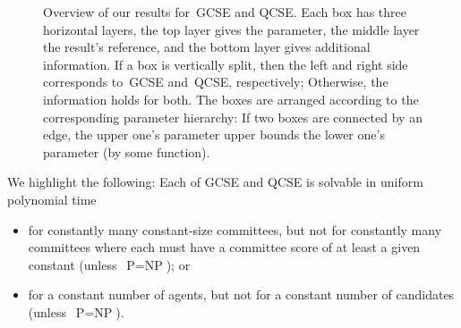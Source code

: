 \documentclass[10pt,a4paper,twocolumn]{article}
\theoremstyle{plain}
\theoremstyle{definition}
\theoremstyle{remark}
\newcommand{\prob}[1]{\textnormal{\textsc{#1}}}
\newcommand{\cocl}[1]{\textrm{#1}}
\newcommand{\NP}{\cocl{NP}}
\newcommand{\classP}{\cocl{P}}
\newcommand{\smlaAcr}{\prob{GCSE}}
\newcommand{\fmlaAcr}{\prob{QCSE}}
\begin{document}
{\begin{figure}[t!]
 \caption{Overview of our results for~\smlaAcr{} and \fmlaAcr{}. 
 Each box has three horizontal layers,
 the top layer gives the parameter,
 the middle layer the result's reference,
 and the bottom layer gives additional information.
 If a box is vertically split,
 then the left and right side corresponds 
 to~\smlaAcr{} and~\fmlaAcr{},
 respectively;
 Otherwise,
 the information holds for both.
 The boxes are arranged according to the corresponding parameter hierarchy:
 If two boxes are connected by an edge,
 the upper one's parameter upper bounds the lower one's parameter (by some function).}
 \label{fig:results}
\end{figure}
%
We highlight the following:
Each of \smlaAcr{} and \fmlaAcr{} is solvable in uniform polynomial time
\begin{itemize}
 \item for constantly many constant-size committees, 
 but not for constantly many committees 
 where each must have a committee score of at least a given constant (unless~$\classP=\NP$);
 or 
 \item for a constant number of agents, 
 but not for a constant number of candidates (unless~$\classP=\NP$).
\end{itemize}
}
\end{document}
